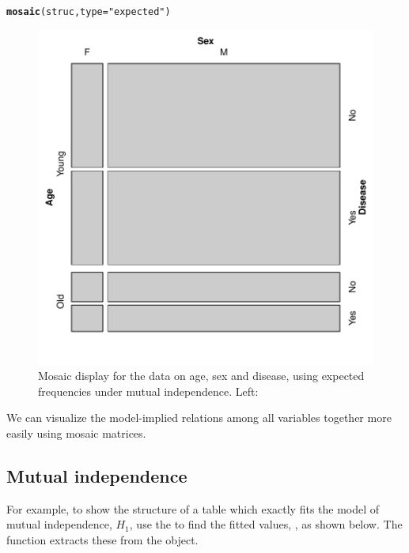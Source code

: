 \documentclass[11pt]{book}\usepackage[]{graphicx}\usepackage[]{color}
\makeatletter
\newcommand{\hlstr}[1]{\textcolor[rgb]{0.192,0.494,0.8}{#1}}%
\newcommand{\hlstd}[1]{\textcolor[rgb]{0.345,0.345,0.345}{#1}}%
\newcommand{\hlkwc}[1]{\textcolor[rgb]{0.333,0.667,0.333}{#1}}%
\newcommand{\hlkwd}[1]{\textcolor[rgb]{0.737,0.353,0.396}{\textbf{#1}}}%
\newenvironment{kframe}{%
 \def\at@end@of@kframe{}%
 \ifinner\ifhmode%
  \def\at@end@of@kframe{\end{minipage}}%
  \begin{minipage}{\columnwidth}%
 \fi\fi%
 \def\FrameCommand##1{\hskip\@totalleftmargin \hskip-\fboxsep
 \colorbox{shadecolor}{##1}\hskip-\fboxsep
     \hskip-\linewidth \hskip-\@totalleftmargin \hskip\columnwidth}%
 \MakeFramed {\advance\hsize-\width
   \@totalleftmargin\z@ \linewidth\hsize
   \@setminipage}}%
 {\par\unskip\endMakeFramed%
 \at@end@of@kframe}
\newenvironment{knitrout}{}{} %
\renewenvironment{knitrout}{\small\renewcommand{\baselinestretch}{.85}}{} %
\makeatother
\begin{document}
\begin{knitrout}
\color{fgcolor}\begin{kframe}
\begin{alltt}
\hlkwd{mosaic}\hlstd{(struc,} \hlkwc{type}\hlstd{=}\hlstr{"expected"}\hlstd{)}
\end{alltt}
\end{kframe}\begin{figure}[htbp]


\centerline{\includegraphics[width=.6\textwidth]{ch05/fig/struc-mos2} }

\caption[Mosaic display for the data on age, sex and disease, using expected frequencies under mutual independence]{Mosaic display for the data on age, sex and disease, using expected frequencies under mutual independence. Left: \label{fig:struc-mos2}}
\end{figure}


\end{knitrout}

We can visualize the model-implied relations among all variables together more easily
using mosaic matrices.

\subsection{Mutual independence}
For example, to show the structure of a table which exactly fits the model of
mutual independence, $H_1$, use the  to find the
fitted values, , as shown below.  The
function  extracts these from the  object.
\end{document}
